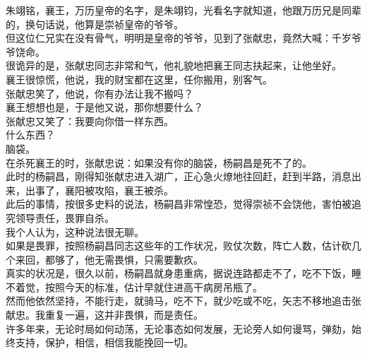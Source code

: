\begin{multicols}{\theparacolNo}
朱翊铭，襄王，万历皇帝的名字，是朱翊钧，光看名字就知道，他跟万历兄是同辈的，换句话说，他算是崇祯皇帝的爷爷。\\

但这位仁兄实在没有骨气，明明是皇帝的爷爷，见到了张献忠，竟然大喊：千岁爷爷饶命。\\

很诡异的是，张献忠同志非常和气，他礼貌地把襄王同志扶起来，让他坐好。\\

襄王很惊慌，他说，我的财宝都在这里，任你搬用，别客气。\\

张献忠笑了，他说，你有办法让我不搬吗？\\

襄王想想也是，于是他又说，那你想要什么？\\

张献忠又笑了：我要向你借一样东西。\\

什么东西？\\

脑袋。\\

在杀死襄王的时，张献忠说：如果没有你的脑袋，杨嗣昌是死不了的。\\

此时的杨嗣昌，刚得知张献忠进入湖广，正心急火燎地往回赶，赶到半路，消息出来，出事了，襄阳被攻陷，襄王被杀。\\

此后的事情，按很多史料的说法，杨嗣昌非常惶恐，觉得崇祯不会饶他，害怕被追究领导责任，畏罪自杀。\\

我个人认为，这种说法很无聊。\\

如果是畏罪，按照杨嗣昌同志这些年的工作状况，败仗次数，阵亡人数，估计砍几个来回，都够了，他无需畏惧，只需要歉疚。\\

真实的状况是，很久以前，杨嗣昌就身患重病，据说连路都走不了，吃不下饭，睡不着觉，按照今天的标准，估计早就住进高干病房吊瓶了。\\

然而他依然坚持，不能行走，就骑马，吃不下，就少吃或不吃，矢志不移地追击张献忠。我重复一遍，这并非畏惧，而是责任。\\

许多年来，无论时局如何动荡，无论事态如何发展，无论旁人如何谩骂，弹劾，始终支持，保护，相信，相信我能挽回一切。\\


\end{multicols}
